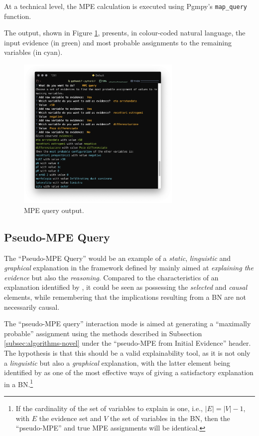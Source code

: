At a technical level, the MPE calculation is executed using Pgmpy's \texttt{map\_query} function. 

The output, shown in Figure \ref{fig:sw_4_mpe}, presents, in colour-coded natural language, the input evidence (in green) and most probable assignments to the remaining variables (in cyan).

\begin{figure}[htbp]
\centerline{\includegraphics[width=0.7\textwidth]{results/images/sw_4_mpe}}
\caption{MPE query output.}
\label{fig:sw_4_mpe}
\end{figure}

\subsection{Pseudo-MPE Query} \label{subsec:results-pseudo-mpe-query}
The \enquote{Pseudo-MPE Query} would be an example of a \textit{static}, \textit{linguistic} and \textit{graphical} explanation in the framework defined by \citet{lacave2002review} mainly aimed at \textit{explaining the evidence} but also the \textit{reasoning}.
Compared to the characteristics of an explanation identified by \citet{miller2018explanation}, it could be seen as possessing the \textit{selected} and \textit{causal} elements, while remembering that the implications resulting from a BN are not necessarily causal.

The \enquote{pseudo-MPE query} interaction mode is aimed at generating a \enquote{maximally probable} assignment using the methods described in Subsection \ref{subsec:algorithms-novel} under the \enquote{pseudo-MPE from Initial Evidence} header.
The hypothesis is that this should be a valid explainability tool, as it is not only a \textit{linguistic} but also a \textit{graphical} explanation, with the latter element being identified by \citet{lacave2002review} as one of the most effective ways of giving a satisfactory explanation in a BN.\footnote{If the cardinality of the set of variables to explain is one, i.e., $|E| = |V|-1$, with $E$ the evidence set and $V$ the set of variables in the BN, then the \enquote{pseudo-MPE} and true MPE assignments will be identical.}

